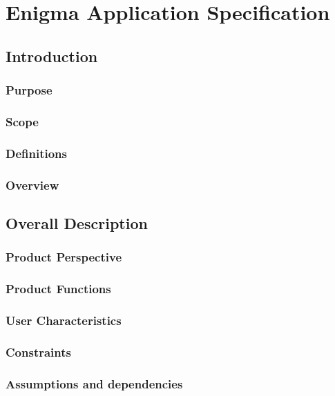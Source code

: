 
\chapter{Enigma Application Specification}
\label{AppendixA}

\section{Introduction}

\subsection{Purpose}

\subsection{Scope}

\subsection{Definitions}

\subsection{Overview}

\section{Overall Description}

\subsection{Product Perspective}

\subsection{Product Functions}

\subsection{User Characteristics}

\subsection{Constraints}

\subsection{Assumptions and dependencies}